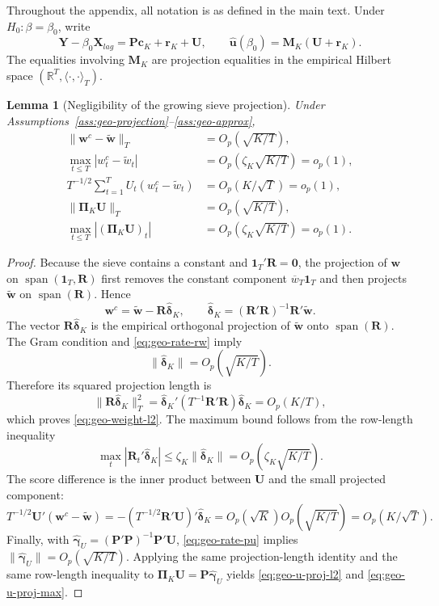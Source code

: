 ﻿\documentclass[11pt]{article}
\newtheorem{lemma}{Lemma}
\begin{document}
Throughout the appendix, all notation is as defined in the main text. Under \(H_0:\beta=\beta_0\), write
\[
    \bm Y-\beta_0\bm X_{lag}=\bm P\bm c_K+\bm r_K+\bm U,
    \qquad
    \widehat{\bm u}(\beta_0)=\bm M_K(\bm U+\bm r_K).
\]
The equalities involving \(\bm M_K\) are projection equalities in the empirical Hilbert space \((\mathbb R^T,\langle\cdot,\cdot\rangle_T)\).

\begin{lemma}[Negligibility of the growing sieve projection]
\label{lem:geo-projection}
Under Assumptions~\ref{ass:geo-projection}--\ref{ass:geo-approx},
\begin{align}
    \|\bm w^c-\widetilde{\bm w}\|_T&=O_p(\sqrt{K/T}),
       \label{eq:geo-weight-l2}\\
    \max_{t\leq T}|w_t^c-\widetilde w_t|&=O_p(\zeta_K\sqrt{K/T})=o_p(1),
       \label{eq:geo-weight-max}\\
    T^{-1/2}\sum_{t=1}^TU_t(w_t^c-\widetilde w_t)&=O_p(K/\sqrt T)=o_p(1),
       \label{eq:geo-weight-score}\\
    \|\bm\Pi_K\bm U\|_T&=O_p(\sqrt{K/T}),
       \label{eq:geo-u-proj-l2}\\
    \max_{t\leq T}|(\bm\Pi_K\bm U)_t|&=O_p(\zeta_K\sqrt{K/T})=o_p(1).
       \label{eq:geo-u-proj-max}
\end{align}
\end{lemma}

\begin{proof}
Because the sieve contains a constant and \(\bm1_T'\bm R=\bm0\), the projection of \(\bm w\) on \(\operatorname{span}(\bm1_T,\bm R)\) first removes the constant component \(\overline w_T\bm1_T\) and then projects \(\widetilde{\bm w}\) on \(\operatorname{span}(\bm R)\). Hence
\[
    \bm w^c=\widetilde{\bm w}-\bm R\widehat{\bm\delta}_K,
    \qquad
    \widehat{\bm\delta}_K=(\bm R'\bm R)^{-1}\bm R'\widetilde{\bm w}.
\]
The vector \(\bm R\widehat{\bm\delta}_K\) is the empirical orthogonal projection of \(\widetilde{\bm w}\) onto \(\operatorname{span}(\bm R)\). The Gram condition and \eqref{eq:geo-rate-rw} imply
\[
    \|\widehat{\bm\delta}_K\|=O_p(\sqrt{K/T}).
\]
Therefore its squared projection length is
\[
    \|\bm R\widehat{\bm\delta}_K\|_T^2
      =\widehat{\bm\delta}_K'(T^{-1}\bm R'\bm R)\widehat{\bm\delta}_K
      =O_p(K/T),
\]
which proves \eqref{eq:geo-weight-l2}. The maximum bound follows from the row-length inequality
\[
    \max_t|\bm R_t'\widehat{\bm\delta}_K|
       \leq\zeta_K\|\widehat{\bm\delta}_K\|
       =O_p(\zeta_K\sqrt{K/T}).
\]
The score difference is the inner product between \(\bm U\) and the small projected component:
\[
    T^{-1/2}\bm U'(\bm w^c-\widetilde{\bm w})
      =-(T^{-1/2}\bm R'\bm U)'\widehat{\bm\delta}_K
      =O_p(\sqrt K)O_p(\sqrt{K/T})=O_p(K/\sqrt T).
\]
Finally, with \(\widehat{\bm\gamma}_U=(\bm P'\bm P)^{-1}\bm P'\bm U\), \eqref{eq:geo-rate-pu} implies \(\|\widehat{\bm\gamma}_U\|=O_p(\sqrt{K/T})\). Applying the same projection-length identity and the same row-length inequality to \(\bm\Pi_K\bm U=\bm P\widehat{\bm\gamma}_U\) yields \eqref{eq:geo-u-proj-l2} and \eqref{eq:geo-u-proj-max}.
\end{proof}
\end{document}
